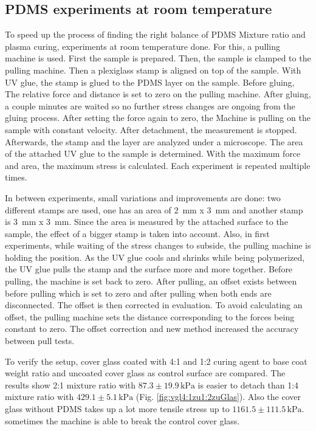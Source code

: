 \subsection{PDMS experiments at room temperature}

To speed up the process of finding the right balance of PDMS Mixture ratio and plasma curing, experiments at room temperature done. For this, a pulling machine is used. First the sample is prepared. Then, the sample is clamped to the pulling machine. Then a plexiglass stamp is aligned on top of the sample. With UV glue, the stamp is glued to the PDMS layer on the sample. Before gluing, The relative force and distance is set to zero on the pulling machine. After gluing, a couple minutes are waited so no further stress changes are ongoing from the gluing process. After setting the force again to zero, the Machine is pulling on the sample with constant velocity. After detachment, the measurement is stopped. Afterwards, the stamp and the layer are analyzed under a microscope. The area of the attached UV glue to the sample is determined. With the maximum force and area, the maximum stress is calculated. Each experiment is repeated multiple times.

In between experiments, small variations and improvements are done: two different stamps are used, one has an area of \SI{2}{\milli\meter} x \SI{3}{\milli\meter} and another stamp is \SI{3}{\milli\meter} x \SI{3}{\milli\meter}. Since the area is measured by the attached surface to the sample, the effect of a bigger stamp is taken into account. Also, in first experiments, while waiting of the stress changes to subside, the pulling machine is holding the position. As the UV glue cools and shrinks while being polymerized, the UV glue pulls the stamp and the surface more and more together. Before pulling, the machine is set back to zero. After pulling, an offset exists between before pulling which is set to zero and after pulling when both ends are disconnected. The offset is then corrected in evaluation. To avoid calculating an offset, the pulling machine sets the distance corresponding to the forces being constant to zero. The offset correction and new method increased the accuracy between pull tests.

To verify the setup, cover glass coated with 4:1 and 1:2 curing agent to base coat weight ratio and uncoated cover glass as control surface are compared. The results show 2:1 mixture ratio with $87.3\pm19.9\,\si{\kilo\pascal}$ is easier to detach than 1:4 mixture ratio with $429.1\pm5.1\,\si{\kilo\pascal}$ (Fig. \ref{fig:vgl4:1zu1:2zuGlas}). Also the cover glass without PDMS takes up a lot more tensile stress up to $1161.5\pm111.5\,\si{\kilo\pascal}$. sometimes the machine is able to break the control cover glass. 

